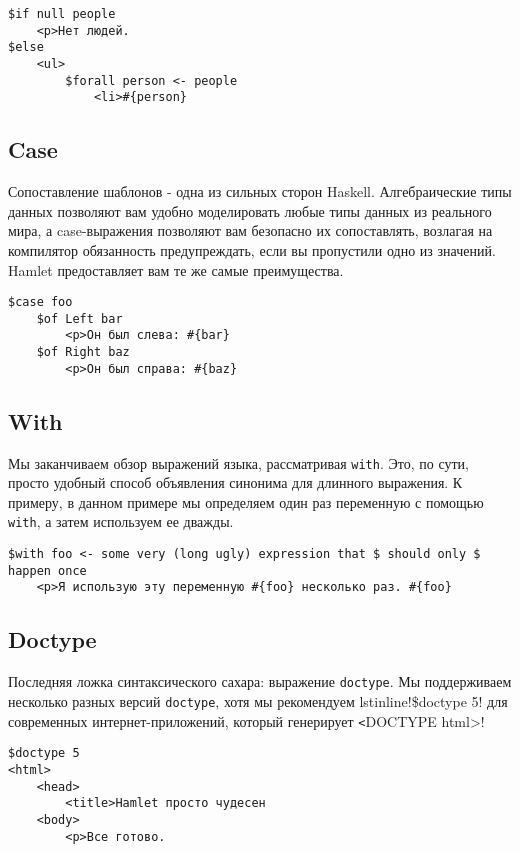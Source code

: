\begin{lstlisting}
$if null people
    <p>Нет людей.
$else
    <ul>
        $forall person <- people
            <li>#{person}
\end{lstlisting}


\subsection{Case}

Сопоставление шаблонов - одна из сильных сторон Haskell. Алгебраические типы данных
позволяют вам удобно моделировать любые типы данных из реального мира, а 
case-выражения позволяют вам безопасно их сопоставлять, возлагая на компилятор
обязанность предупреждать, если вы пропустили одно из значений.
Hamlet предоставляет вам те же самые преимущества.

\begin{lstlisting}
$case foo
    $of Left bar
        <p>Он был слева: #{bar}
    $of Right baz
        <p>Он был справа: #{baz}
\end{lstlisting}

\subsection{With}

Мы заканчиваем обзор выражений языка, рассматривая \texttt{with}. Это, по сути,
просто удобный способ объявления синонима для длинного выражения. К примеру, 
в данном примере мы определяем один раз переменную с помощью \texttt{with}, а затем
используем ее дважды.

\begin{lstlisting}
$with foo <- some very (long ugly) expression that $ should only $ happen once
    <p>Я использую эту переменную #{foo} несколько раз. #{foo}
\end{lstlisting}

\subsection{Doctype}
Последняя ложка синтаксического сахара: выражение \texttt{doctype}. Мы
поддерживаем несколько разных версий \texttt{doctype}, хотя мы рекомендуем
lstinline!\$doctype 5! для современных интернет-приложений, который генерирует
\lstinline!<!DOCTYPE html>!

\begin{lstlisting}
$doctype 5
<html>
    <head>
        <title>Hamlet просто чудесен
    <body>
        <p>Все готово.
\end{lstlisting}

